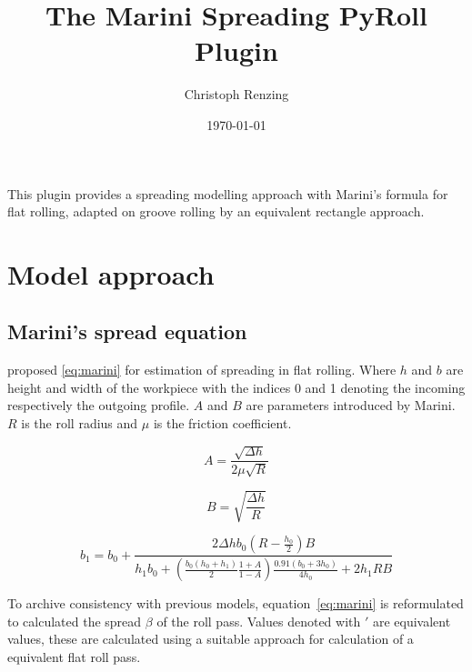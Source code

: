 \documentclass[11pt]{PyRollDocs}
\begin{document}
    \title{The Marini Spreading PyRoll Plugin}
    \author{Christoph Renzing}
    \date{\today}

    \maketitle

    This plugin provides a spreading modelling approach with Marini's formula for flat rolling, adapted on groove rolling by an equivalent rectangle approach.


    \section{Model approach}\label{sec:model-approach}

    \subsection{Marini's spread equation}\label{subsec:marinis's-spread-equation}

    \textcite{Marini1941} proposed \autoref{eq:marini} for estimation of spreading in flat rolling.
    Where $h$ and $b$ are height and width of the workpiece with the indices 0 and 1 denoting the incoming respectively the outgoing profile.
    $A$ and $B$ are parameters introduced by Marini.
    $R$ is the roll radius and $\mu$ is the friction coefficient.


    \begin{equation}
        A = \frac{\sqrt{\Delta h}}{2 \mu \sqrt{R}}
        \label{eq:marini-parameter-a}
    \end{equation}

    \begin{equation}
        B = \sqrt{\frac{\Delta h}{R}}
        \label{eq:marini-parameter-b}
    \end{equation}

    \begin{equation}
        b_1 = b_0 + \frac{2 \Delta h b_0 \left( R - \frac{h_0}{2} \right) B }{h_1 b_0 + \left( \frac{b_0 \left( h_0 + h_1 \right)}{2} \frac{1 + A}{1 - A} \right) \frac{0.91 \left( b_0 + 3 h_0 \right)}{4 h_0} + 2 h_1 R B}
        \label{eq:marini}
    \end{equation}

    To archive consistency with previous models, equation~\ref{eq:marini} is reformulated to calculated the spread $\beta$ of the roll pass.
    Values denoted with $'$ are equivalent values, these are calculated using a suitable approach for calculation of a equivalent flat roll pass.
\end{document}

